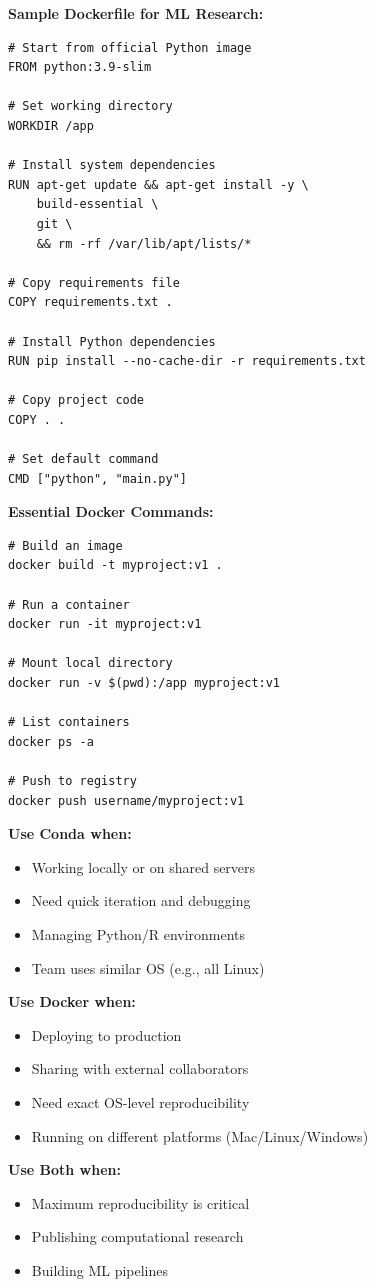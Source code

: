 \documentclass[11pt,a4paper]{article}
\begin{document}
\textbf{Sample Dockerfile for ML Research:}

\begin{lstlisting}[style=pythonstyle, caption=Dockerfile]
# Start from official Python image
FROM python:3.9-slim

# Set working directory
WORKDIR /app

# Install system dependencies
RUN apt-get update && apt-get install -y \
    build-essential \
    git \
    && rm -rf /var/lib/apt/lists/*

# Copy requirements file
COPY requirements.txt .

# Install Python dependencies
RUN pip install --no-cache-dir -r requirements.txt

# Copy project code
COPY . .

# Set default command
CMD ["python", "main.py"]
\end{lstlisting}

\textbf{Essential Docker Commands:}

\begin{lstlisting}[style=bashstyle]
# Build an image
docker build -t myproject:v1 .

# Run a container
docker run -it myproject:v1

# Mount local directory
docker run -v $(pwd):/app myproject:v1

# List containers
docker ps -a

# Push to registry
docker push username/myproject:v1
\end{lstlisting}

\begin{tcolorbox}[colback=red!5,colframe=red!40,title={When to Use What?}]
\textbf{Use Conda when:}
\begin{itemize}
    \item Working locally or on shared servers
    \item Need quick iteration and debugging
    \item Managing Python/R environments
    \item Team uses similar OS (e.g., all Linux)
\end{itemize}

\textbf{Use Docker when:}
\begin{itemize}
    \item Deploying to production
    \item Sharing with external collaborators
    \item Need exact OS-level reproducibility
    \item Running on different platforms (Mac/Linux/Windows)
\end{itemize}

\textbf{Use Both when:}
\begin{itemize}
    \item Maximum reproducibility is critical
    \item Publishing computational research
    \item Building ML pipelines
\end{itemize}
\end{tcolorbox}
\end{document}
